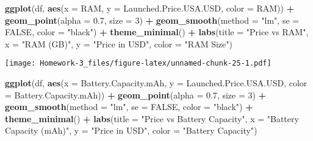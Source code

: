 \documentclass[
]{article}
\newenvironment{Shaded}{\begin{snugshade}}{\end{snugshade}}
\newcommand{\AttributeTok}[1]{\textcolor[rgb]{0.13,0.29,0.53}{#1}}
\newcommand{\ConstantTok}[1]{\textcolor[rgb]{0.56,0.35,0.01}{#1}}
\newcommand{\DecValTok}[1]{\textcolor[rgb]{0.00,0.00,0.81}{#1}}
\newcommand{\FloatTok}[1]{\textcolor[rgb]{0.00,0.00,0.81}{#1}}
\newcommand{\FunctionTok}[1]{\textcolor[rgb]{0.13,0.29,0.53}{\textbf{#1}}}
\newcommand{\NormalTok}[1]{#1}
\newcommand{\SpecialCharTok}[1]{\textcolor[rgb]{0.81,0.36,0.00}{\textbf{#1}}}
\newcommand{\StringTok}[1]{\textcolor[rgb]{0.31,0.60,0.02}{#1}}
\begin{document}
\begin{Shaded}
\begin{Highlighting}[]
\FunctionTok{ggplot}\NormalTok{(df, }\FunctionTok{aes}\NormalTok{(}\AttributeTok{x =}\NormalTok{ RAM, }\AttributeTok{y =}\NormalTok{ Launched.Price.USA.USD, }\AttributeTok{color =}\NormalTok{ RAM)) }\SpecialCharTok{+}
  \FunctionTok{geom\_point}\NormalTok{(}\AttributeTok{alpha =} \FloatTok{0.7}\NormalTok{, }\AttributeTok{size =} \DecValTok{3}\NormalTok{) }\SpecialCharTok{+}
  \FunctionTok{geom\_smooth}\NormalTok{(}\AttributeTok{method =} \StringTok{"lm"}\NormalTok{, }\AttributeTok{se =} \ConstantTok{FALSE}\NormalTok{, }\AttributeTok{color =} \StringTok{"black"}\NormalTok{) }\SpecialCharTok{+}  
  \FunctionTok{theme\_minimal}\NormalTok{() }\SpecialCharTok{+}
  \FunctionTok{labs}\NormalTok{(}\AttributeTok{title =} \StringTok{"Price vs RAM"}\NormalTok{,}
       \AttributeTok{x =} \StringTok{"RAM (GB)"}\NormalTok{,}
       \AttributeTok{y =} \StringTok{"Price in USD"}\NormalTok{,}
       \AttributeTok{color =} \StringTok{"RAM Size"}\NormalTok{)}
\end{Highlighting}
\end{Shaded}

\texttt{[image: Homework-3\_files/figure-latex/unnamed-chunk-25-1.pdf]}

\begin{Shaded}
\begin{Highlighting}[]
\FunctionTok{ggplot}\NormalTok{(df, }\FunctionTok{aes}\NormalTok{(}\AttributeTok{x =}\NormalTok{ Battery.Capacity.mAh, }\AttributeTok{y =}\NormalTok{ Launched.Price.USA.USD, }\AttributeTok{color =}\NormalTok{ Battery.Capacity.mAh)) }\SpecialCharTok{+}
  \FunctionTok{geom\_point}\NormalTok{(}\AttributeTok{alpha =} \FloatTok{0.7}\NormalTok{, }\AttributeTok{size =} \DecValTok{3}\NormalTok{) }\SpecialCharTok{+}
  \FunctionTok{geom\_smooth}\NormalTok{(}\AttributeTok{method =} \StringTok{"lm"}\NormalTok{, }\AttributeTok{se =} \ConstantTok{FALSE}\NormalTok{, }\AttributeTok{color =} \StringTok{"black"}\NormalTok{) }\SpecialCharTok{+}
  \FunctionTok{theme\_minimal}\NormalTok{() }\SpecialCharTok{+}
  \FunctionTok{labs}\NormalTok{(}\AttributeTok{title =} \StringTok{"Price vs Battery Capacity"}\NormalTok{,}
       \AttributeTok{x =} \StringTok{"Battery Capacity (mAh)"}\NormalTok{,}
       \AttributeTok{y =} \StringTok{"Price in USD"}\NormalTok{,}
       \AttributeTok{color =} \StringTok{"Battery Capacity"}\NormalTok{)}
\end{Highlighting}
\end{Shaded}
\end{document}
